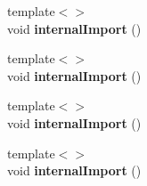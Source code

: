 \begin{DoxyCompactItemize}
\item 
{\footnotesize template$<$$>$ }\\void {\bfseries internal\+Import} ()\hypertarget{class_map_a2147ce914ccd1715f3630fea7684ffcb}{}\label{class_map_a2147ce914ccd1715f3630fea7684ffcb}

\item 
{\footnotesize template$<$$>$ }\\void {\bfseries internal\+Import} ()\hypertarget{class_map_a8cd164b26f77a264c266fa4a3d851885}{}\label{class_map_a8cd164b26f77a264c266fa4a3d851885}

\item 
{\footnotesize template$<$$>$ }\\void {\bfseries internal\+Import} ()\hypertarget{class_map_a483abbb9addc71bcd6afdece77956bb4}{}\label{class_map_a483abbb9addc71bcd6afdece77956bb4}

\item 
{\footnotesize template$<$$>$ }\\void {\bfseries internal\+Import} ()\hypertarget{class_map_a3d33777a41f2e3a3c818c6b24264a2df}{}\label{class_map_a3d33777a41f2e3a3c818c6b24264a2df}


\end{DoxyCompactItemize}
